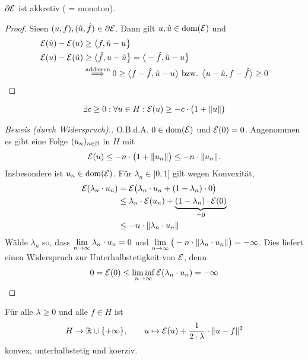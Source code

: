 \begin{lemma}
$\partial\mathcal{E}$ ist akkretiv ( = monoton).
\end{lemma}
\begin{proof}
Sieen $(u,f),(\hat{u},\hat{f})\in\partial\mathcal{E}$. Dann gilt $u,\hat{u}\in\text{dom}(\mathcal{E})$ und 
\begin{align*}
\mathcal{E}(\hat{u})-\mathcal{E}(u)&\geq\big\langle f,\hat{u}-u\big\rbrace\\
\mathcal{E}(u)-\mathcal{E}(\hat{u})&\geq\big\langle \hat{f},u-\hat{u}\big\rbrace=\big\langle-\hat{f},\hat{u}-u\big\rbrace\\
&\stackrel{\text{addieren}}{\implies}
0\geq\big\langle f-\hat{f},\hat{u}-u\big\rangle
\text{ bzw. }
\big\langle u-\hat{u},f-\hat{f}\big\rangle\geq0
\end{align*}
\end{proof}

\begin{lemma}
\begin{align*}
\exists c\geq0:\forall u\in H:\mathcal{E}(u)\geq -c\cdot\big(1+\Vert u\Vert\big)
\end{align*}
\end{lemma}
\begin{proof}[Beweis (durch Widerspruch).]\enter
O.B.d.A. $0\in\text{dom}(\mathcal{E})$ und $\mathcal{E}(0)=0$. Angenommen es gibt eine Folge $(u_n)_{n\in\mathbb{N}}$ in $H$ mit
\begin{align*}
\mathcal{E}(u)\leq -n\cdot\big(1+\Vert u_n\Vert\big)\leq -n\cdot\Vert u_n\Vert.
\end{align*}
Insbesondere ist $u_n\in\text{dom}(\mathcal{E})$. Für $\lambda_n\in]0,1]$ gilt wegen Konvexität,
\begin{align*}
\mathcal{E}(\lambda_n\cdot u_n)
&=\mathcal{E}\big(\lambda_n\cdot u_n+(1-\lambda_n)\cdot 0\big)\\
&\leq\lambda_n\cdot\mathcal{E}(u_n)+\underbrace{(1-\lambda_n)\cdot\mathcal{E}(0)}_{=0}\\
&\leq- n\cdot\Vert\lambda_n\cdot u_n\Vert
\end{align*}
Wähle $\lambda_n$ so, dass $\lim\limits_{n\to\infty}\lambda_n\cdot u_n=0$ und $\lim\limits_{n\to\infty}\big(-n\cdot\Vert\lambda_n\cdot u_n\Vert\big)=-\infty$. Dies liefert einen Widerspruch zur Unterhalbstetigkeit von $\mathcal{E}$, denn
\begin{align*}
0=\mathcal{E}(0)\leq\liminf\limits_{n\to\infty}\mathcal{E}(\lambda_n\cdot u_n)=-\infty
\end{align*}
\end{proof}

\begin{lemma}
Für alle $\lambda\geq0$ und alle $f\in H$ ist
\begin{align*}
H\to\mathbb{R}\cup\lbrace+\infty\rbrace,\qquad u\mapsto\mathcal{E}(u)+\frac{1}{2\cdot\lambda}\cdot\Vert u-f\Vert^2
\end{align*}
konvex, unterhalbstetig und koerziv.
\end{lemma}
